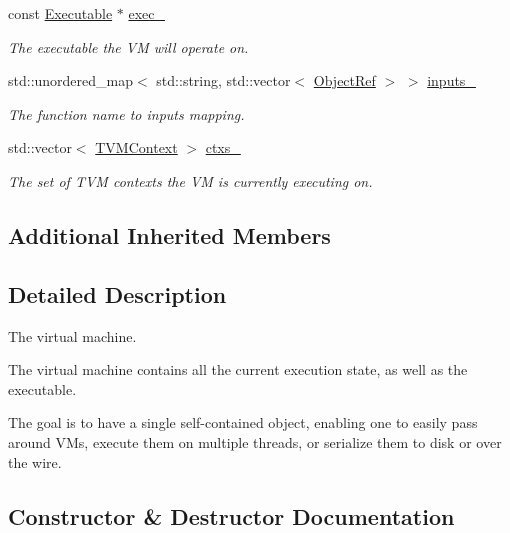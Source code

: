 \begin{DoxyCompactItemize}
const \hyperlink{classtvm_1_1runtime_1_1vm_1_1Executable}{Executable} $\ast$ \hyperlink{classtvm_1_1runtime_1_1vm_1_1VirtualMachine_ad478992798013d0e3a72d220003c8881}{exec\+\_\+}
\begin{DoxyCompactList}\small\item\em The executable the VM will operate on. \end{DoxyCompactList}\item 
std\+::unordered\+\_\+map$<$ std\+::string, std\+::vector$<$ \hyperlink{classtvm_1_1runtime_1_1ObjectRef}{Object\+Ref} $>$ $>$ \hyperlink{classtvm_1_1runtime_1_1vm_1_1VirtualMachine_a7d46e436c01133647cd303719752f456}{inputs\+\_\+}
\begin{DoxyCompactList}\small\item\em The function name to inputs mapping. \end{DoxyCompactList}\item 
std\+::vector$<$ \hyperlink{c__runtime__api_8h_a9363bb701f16ce5bbb381f2a013d25b4}{T\+V\+M\+Context} $>$ \hyperlink{classtvm_1_1runtime_1_1vm_1_1VirtualMachine_ae52ecf76ef854f8288ca2baa8f9d01ed}{ctxs\+\_\+}
\begin{DoxyCompactList}\small\item\em The set of T\+VM contexts the VM is currently executing on. \end{DoxyCompactList}\end{DoxyCompactItemize}
\subsection*{Additional Inherited Members}


\subsection{Detailed Description}
The virtual machine. 

The virtual machine contains all the current execution state, as well as the executable.

The goal is to have a single self-\/contained object, enabling one to easily pass around V\+Ms, execute them on multiple threads, or serialize them to disk or over the wire. 

\subsection{Constructor \& Destructor Documentation}

